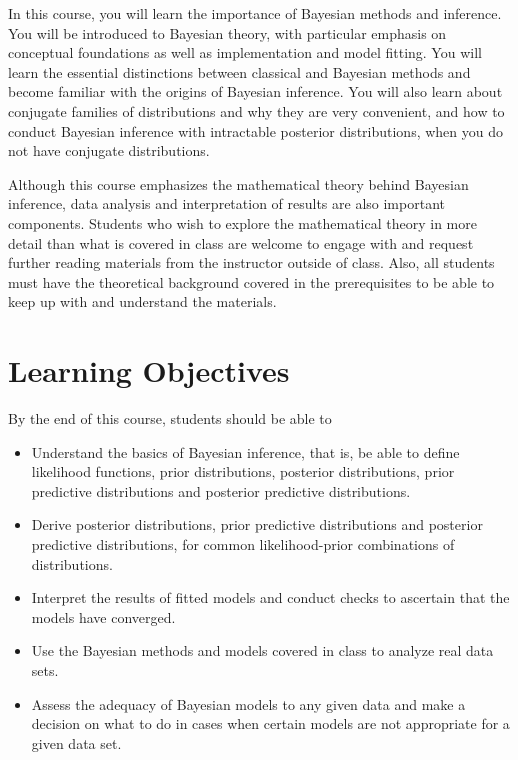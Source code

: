 \documentclass[11pt, a4paper]{article}
\begin{document}
In this course, you will learn the importance of Bayesian methods and inference. You will be introduced to Bayesian theory, with particular emphasis on conceptual foundations as well as implementation and model fitting. You will learn the essential distinctions between classical and Bayesian methods and become familiar with the origins of Bayesian inference. You will also learn about conjugate families of distributions and why they are very convenient, and how to conduct Bayesian inference with intractable posterior distributions,  when you do not have conjugate distributions.

Although this course emphasizes the mathematical theory behind Bayesian inference, data analysis and interpretation of results are also important components. Students who wish to explore the mathematical theory in more detail than what is covered in class are welcome to engage with and request further reading materials from the instructor outside of class. Also, all students must have the theoretical background covered in the prerequisites to be able to keep up with and understand the materials. 

\section{Learning Objectives}
By the end of this course, students should be able to
\begin{itemize}[label= {\color{darkblue}{\ArrowBoldRightStrobe}}]
	\item Understand the basics of Bayesian inference, that is, be able to define likelihood functions, prior distributions, posterior distributions, prior predictive distributions and posterior predictive distributions.
	\item Derive posterior distributions, prior predictive distributions and posterior predictive distributions, for common likelihood-prior combinations of distributions.
	\item Interpret the results of fitted models and conduct checks to ascertain that the models have converged.
	\item Use the Bayesian methods and models covered in class to analyze real data sets.
	\item Assess the adequacy of Bayesian models to any given data and make a decision on what to do in cases when certain models are not appropriate for a given data set.
\end{itemize}
\end{document}
